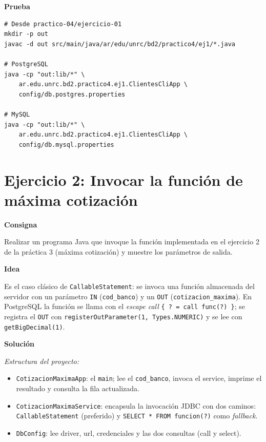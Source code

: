 \documentclass[11pt,a4paper]{article}
\newcommand{\itemcabecera}[1]{\noindent\textbf{#1}\par\medskip}
\newcommand{\bloqueConsigna}{\itemcabecera{Consigna}}
\newcommand{\bloqueIdea}{\itemcabecera{Idea}}
\newcommand{\bloqueSolucion}{\itemcabecera{Soluci\'on}}
\newcommand{\bloquePrueba}{\itemcabecera{Prueba}}
\begin{document}
\bloquePrueba

\begin{lstlisting}[style=shellstyle]
# Desde practico-04/ejercicio-01
mkdir -p out
javac -d out src/main/java/ar/edu/unrc/bd2/practico4/ej1/*.java

# PostgreSQL
java -cp "out:lib/*" \
    ar.edu.unrc.bd2.practico4.ej1.ClientesCliApp \
    config/db.postgres.properties

# MySQL
java -cp "out:lib/*" \
    ar.edu.unrc.bd2.practico4.ej1.ClientesCliApp \
    config/db.mysql.properties
\end{lstlisting}

\section{Ejercicio 2: Invocar la función de máxima cotización}

\bloqueConsigna

Realizar un programa Java que invoque la función implementada en el ejercicio 2 de la práctica 3 (máxima cotización) y muestre los parámetros de salida.

\bloqueIdea

Es el caso clásico de \texttt{CallableStatement}: se invoca una función almacenada del servidor con un parámetro \texttt{IN} (\texttt{cod\_banco}) y un \texttt{OUT} (\texttt{cotizacion\_maxima}). En PostgreSQL la función se llama con el \emph{escape call} \texttt{\{ ? = call func(?) \}}; se registra el \texttt{OUT} con \texttt{registerOutParameter(1, Types.NUMERIC)} y se lee con \texttt{getBigDecimal(1)}.

\bloqueSolucion

\textit{Estructura del proyecto:}

\begin{itemize}
    \item \texttt{CotizacionMaximaApp}: el \texttt{main}; lee el \texttt{cod\_banco}, invoca el service, imprime el resultado y consulta la fila actualizada.
    \item \texttt{CotizacionMaximaService}: encapsula la invocación JDBC con dos caminos: \texttt{CallableStatement} (preferido) y \texttt{SELECT * FROM funcion(?)} como \emph{fallback}.
    \item \texttt{DbConfig}: lee driver, url, credenciales y las dos consultas (call y select).
\end{itemize}
\end{document}
